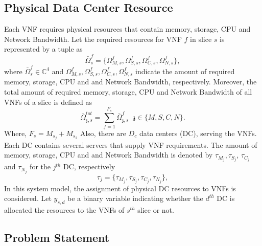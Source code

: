 \documentclass[conference]{IEEEtran}
\begin{document}
\subsection{Physical Data Center Resource}
Each VNF requires
physical resources that contain memory, storage, CPU and Network Bandwidth.
Let the required resources for VNF $f$ in slice $s$ is represented by a tuple as
\begin{equation}
\bar{\Omega}_{s}^f = \{\Omega_{M,{s}}^f, \Omega_{S,{s}}^f, \Omega_{C,{s}}^f, \Omega_{N,{s}}^f \},
\end{equation}
where $\bar{\Omega}_{s}^f\in \mathbb{C}^{4}$ and $\Omega_{M,{s}}^f, \Omega_{S,{s}}^f, \Omega_{C,{s}}^f, \Omega_{N,{s}}^f$ indicate the amount of required memory, storage, CPU and and Network Bandwidth, respectively.
Moreover, the total amount of required memory, storage, CPU and Network Bandwidth of all VNFs of a slice is defined as
\begin{equation}
\textstyle \bar{\Omega}_{\mathfrak{z},s}^{tot} = \sum_{f=1}^{F_s}\bar{\Omega}_{\mathfrak{z},s}^f \;\; \mathfrak{z} \in \{M, S, C, N\}.
\end{equation}
Where, $F_s = M_{s_j} + M_{s_2}$
Also, there are $D_c$ data centers (DC), serving the VNFs. Each DC contains several servers that supply VNF requirements.
The amount of memory, storage, CPU and and Network Bandwidth is denoted by $\tau_{M_{j}}, \tau_{S_{j}}$, $\tau_{C_{j}} $ and $\tau_{N_{j}} $ for the $j^{th}$ DC, respectively
\begin{equation*}
\tau_j = \{\tau_{M_{j}}, \tau_{S_{j}}, \tau_{C_{j}}, \tau_{N_{j}} \},
\end{equation*}
In this system model, the assignment of physical DC resources to VNFs is considered. Let $y_{s,d}$ be a binary variable indicating whether the $d^{th}$ DC is allocated the resources to the VNFs of $s^{th}$ slice or not.
\subsection{Problem Statement}


\newpage
\end{document}
